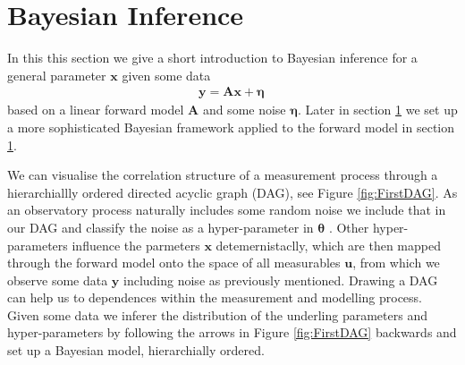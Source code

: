 \section{Bayesian Inference}
In this this section we give a short introduction to Bayesian inference for a general parameter $\bm{x}$ given some data 
\begin{align}
	\bm{y} = \bm{Ax} + \bm{\eta} \, 
	\label{eq:LinDat}
\end{align}
based on a linear forward model $\bm{A}$ and some noise $ \bm{\eta}$.
Later in section \ref{} we set up a more sophisticated Bayesian framework applied to the forward model in section \ref{}.

We can visualise the correlation structure of a measurement process through a hierarchiallly ordered directed acyclic graph (DAG), see Figure \ref{fig:FirstDAG}.
As an observatory process naturally includes some random noise we include that in our DAG and classify the noise as a hyper-parameter in $\bm{\theta}$ \cite{fox2016fast}.
Other hyper-parameters influence the parmeters $\bm{x}$ detemernistaclly, which are then mapped through the forward model onto the space of all measurables $\bm{u}$, from which we observe some data $\bm{y}$ including noise as previously mentioned.
Drawing a DAG can help us to dependences within the measurement and modelling process.
Given some data we inferer the distribution of the underling parameters and hyper-parameters by following the arrows in Figure \ref{fig:FirstDAG} backwards and set up a Bayesian model, hierarchially ordered.
